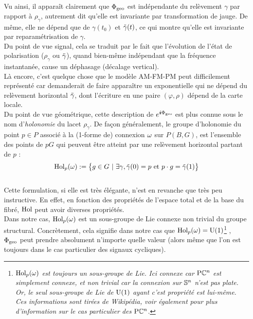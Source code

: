 \noindent Vu ainsi, il apparaît clairement que $\phaseg$ est indépendante du relèvement $\gamma$ par rapport à $\rho_\gamma$, autrement dit qu'elle est invariante par transformation de jauge. 
De même, elle ne dépend que de $\gamma(t_0)$ et $\Tilde{\gamma}(t)$, ce qui montre qu'elle est invariante par reparamétrisation de $\gamma$.
\\

Du point de vue signal, cela se traduit par le fait que l'évolution de l'état de polarisation ($\rho_\gamma$ ou $\Tilde{\gamma}$), quand bien-même indépendant que la fréquence instantanée, cause un déphasage (décalage vertical). \\
Là encore, c'est quelque chose que le modèle AM-FM-PM peut difficilement représenté car demanderait de faire apparaître un exponentielle qui ne dépend du relèvement horizontal $\Tilde{\gamma}$, dont l'écriture en une paire $(\varphi,\rho)$ dépend de la carte locale.
\\ 

Du point de vue géométrique, cette description de  $e^{\i \phaseg}$ est plus connue sous le nom d’\emph{holonomie} du lacet $\rho_\gamma$. De façon généralement, le groupe d'holonomie du point $p\in P$ associé à la (1-forme de) connexion $\conn$ sur $P(B,G)$, est l'ensemble des points de $pG$ qui peuvent être atteint par une relèvement horizontal partant de $p$ :
\begin{equation} \label{eq:def2Hol}
	\Hol_p(\conn) \defeq \big\{ g\in G\ |\ \exists \gamma, \Tilde{\gamma}(0) = p \text{ et } p\cdot g = \Tilde{\gamma}(1) \big\}
\end{equation}
\\
Cette formulation, si elle est très élégante, n'est en revanche que très peu instructive. En effet, en fonction des propriétés de l'espace total et de la base du fibré, $\Hol$ peut avoir diverses propriétés. 
\\
Dans notre cas, $\Hol_p(\conn)$ est un sous-groupe de Lie connexe non trivial du groupe structural. Concrètement, cela signifie dans notre cas que $\Hol_p(\conn)=\U{1}$\footnote{\itshape
	$\Hol_p(\conn)$ est toujours un sous-groupe de Lie. Ici connexe car $\PC{n}$ est simplement connexe, et non trivial car la connexion sur $\S{n}$ n'est pas plate.  Or, le seul sous-groupe de Lie de $\U{1}$ ayant c'est propriété est lui-même. Ces informations sont tirées de Wikipédia, voir également \cite[sec. 8.5.3]{nakahara_geometry_2003} pour plus d'information sur le cas particulier des $\PC{n}$.}
, \ie~$\phaseg$ peut prendre absolument n'importe quelle valeur (alors même que l'on est toujours dans le cas particulier des signaux cycliques).
\\



